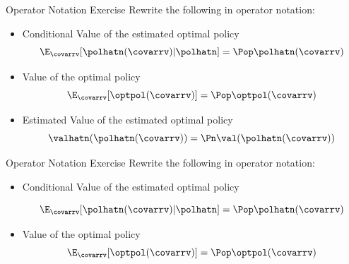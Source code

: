 \documentclass[aspectratio=169, professionalfonts]{beamer}
\begin{document}
\begin{frame}{Operator Notation Exercise}
	Rewrite the following in operator notation:
	\vfill
	\begin{itemize}

		\item Conditional Value of the estimated optimal policy
		      \pause
		      $$\E_{\covarrv}[\polhatn(\covarrv) \vert \polhatn] = \Pop \polhatn(\covarrv)$$
		      \pause
		\item Value of the optimal policy
		      \pause
		      $$\E_{\covarrv}[\optpol(\covarrv)] = \Pop \optpol(\covarrv)$$
		      \pause
		\item Estimated Value of the estimated optimal policy
		      \pause
		      $$\valhatn(\polhatn(\covarrv)) = \Pn \val(\polhatn(\covarrv))$$
	\end{itemize}
	\vfill

\end{frame}


\begin{frame}{Operator Notation Exercise}
	Rewrite the following in operator notation:
	\vfill
	\begin{itemize}

		\item Conditional Value of the estimated optimal policy

		      $$\E_{\covarrv}[\polhatn(\covarrv) \vert \polhatn] = \Pop \polhatn(\covarrv)$$

		\item Value of the optimal policy
		      $$\E_{\covarrv}[\optpol(\covarrv)] = \Pop \optpol(\covarrv)$$
	\end{itemize}
	\vfill

\end{frame}
\end{document}
